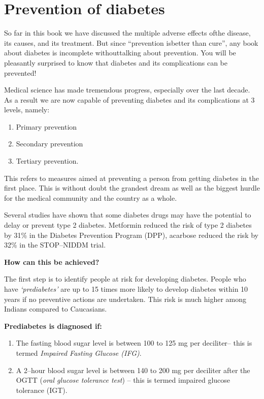 \chapter{Prevention of diabetes}\label{chap25}

So far in this book we have discussed the multiple adverse effects of\break the disease, its causes, and its treatment. But since “prevention is\break better than cure”, any book about diabetes is incomplete without\break talking about prevention. You will be pleasantly surprised to know that diabetes and its complications can be prevented!

Medical science has made tremendous progress, especially over the last decade. As a result we are now capable of preventing diabetes and its complications at 3 levels, namely:

\begin{enumerate}
\itemsep=0pt
\item Primary prevention
\item Secondary prevention
\item Tertiary prevention.
\end{enumerate}


This refers to measures aimed at preventing a person from getting diabetes in the first place. This is without doubt the grandest dream as well as the biggest hurdle for the medical community and the country as a whole.

Several studies have shown that some diabetes drugs may have the potential to delay or prevent type 2 diabetes. Metformin reduced the risk of type 2 diabetes by 31\% in the Diabetes Prevention Program (DPP), acarbose reduced the risk by 32\% in the STOP–NIDDM trial.

\noindent\textbf{How can this be achieved?}

The first step is to identify people at risk for developing diabetes. People who have \textit{‘prediabetes’} are up to 15 times more likely to develop diabetes within 10 years if no preventive actions are undertaken. This risk is much higher among Indians compared to Caucasians.

\noindent\textbf{Prediabetes is diagnosed if:}

\begin{enumerate}[•]
\itemsep=0pt
\item The fasting blood sugar level is between 100 to 125 mg per deci\-li\-ter– this is termed \textit{Impaired Fasting Glucose (IFG)}.
\item A 2–hour blood sugar level is between 140 to 200 mg per deciliter after the OGTT (\textit{oral glucose tolerance test}) – this is termed impaired glucose tolerance (IGT).
\end{enumerate}


